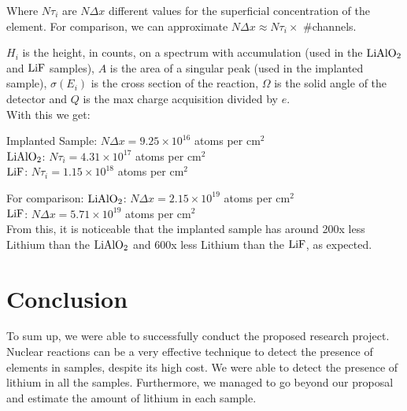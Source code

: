 \documentclass{article}
\begin{document}
\begin{multicols}{2}
\vspace{4mm}

Where $N\tau_i$ are $N\Delta x$ different values for the superficial concentration of the element. For comparison, we can approximate $N\Delta x \approx N\tau_i \times$ \#channels.

$H_i$ is the height, in counts, on a spectrum with accumulation (used in the $\ce{LiAlO2}$ and $\ce{LiF}$ samples), $A$ is the area of a singular peak (used in the implanted sample), $\sigma (E_i) $ is the cross section of the reaction, $\Omega$ is the solid angle of the detector and $Q$ is the max charge acquisition divided by $e$.\\

With this we get:

Implanted Sample: $N\Delta x = 9.25\times 10^{16}$ atoms per cm$^2$\\
$\ce{LiAlO2}$: $N\tau_i=4.31\times10^{17}$ atoms per cm$^2$\\
$\ce{LiF}$: $N\tau_i=1.15\times10^{18}$ atoms per cm$^2$

For comparison:
$\ce{LiAlO2}$: $N\Delta x=2.15\times10^{19}$ atoms per cm$^2$\\
$\ce{LiF}$: $N\Delta x=5.71\times10^{19}$ atoms per cm$^2$\\

From this, it is noticeable that the implanted sample has around 200x less Lithium than the $\ce{LiAlO2}$ and 600x less Lithium than the $\ce{LiF}$, as expected.

\section{Conclusion}
    \label{sec:conclusion}

To sum up, we were able to successfully conduct the proposed research project.
Nuclear reactions can be a very effective technique to detect the presence of elements in samples, despite its high cost.
We were able to detect the presence of lithium in all the samples. 
Furthermore, we managed to go beyond our proposal and estimate the amount of lithium in each sample.

\nocite{*}
\printbibliography


\end{multicols}
\end{document}
